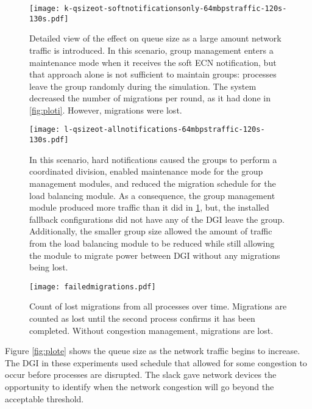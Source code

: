 \begin{figure}
\centering
\texttt{[image: k-qsizeot-softnotificationsonly-64mbpstraffic-120s-130s.pdf]}
\caption[Detailed view of the effect on queue size as a large amount network traffic is introduced.]{
Detailed view of the effect on queue size as a large amount network traffic is introduced.
In this scenario, group management enters a maintenance mode when it receives the soft \ac{ECN} notification, but that approach alone is not sufficient to maintain groups: processes leave the group randomly during the simulation.
The system decreased the number of migrations per round, as it had done in \ref{fig:ploti}.
However, migrations were lost.
}
\label{fig:plotk}
\centering
\end{figure}

\begin{figure}
\centering
\texttt{[image: l-qsizeot-allnotifications-64mbpstraffic-120s-130s.pdf]}
\caption[Effect on queue size as a large amount of network traffic is introduced.]
{
In this scenario, hard notifications caused the groups to perform a coordinated division, enabled maintenance mode for the group management modules, and reduced the migration schedule for the load balancing module.
As a consequence, the group management module produced more traffic than it did in \ref{fig:plotk}, but, the installed fallback configurations did not have any of the \ac{DGI} leave the group.
Additionally, the smaller group size allowed the amount of traffic from the load balancing module to be reduced while still allowing the module to migrate power between \ac{DGI} without any migrations being lost.
}
\label{fig:plotl}
\end{figure}

\begin{figure}
\centering
\texttt{[image: failedmigrations.pdf]}
\caption[Count of lost migrations from all processes over time.]{Count of lost migrations from all processes over time. Migrations are counted as lost until the second process confirms it has been completed. Without congestion management, migrations are lost.}
\label{fig:plotg}
\end{figure}

Figure \ref{fig:plote} shows the queue size as the network traffic begins to increase.
The \ac{DGI} in these experiments used schedule that allowed for some congestion to occur before processes are disrupted.
The slack gave network devices the opportunity to identify when the network congestion will go beyond the acceptable threshold.


